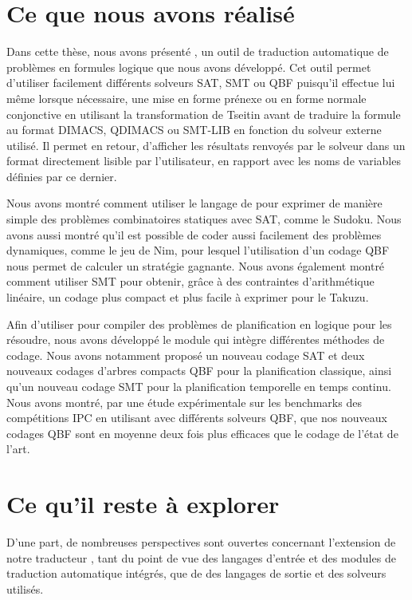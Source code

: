 \section{Ce que nous avons réalisé}

Dans cette thèse, nous avons présenté \touist, un outil de traduction automatique de problèmes en formules logique que nous avons développé. Cet outil permet d'utiliser facilement différents solveurs SAT, SMT ou QBF puisqu'il effectue lui même lorsque nécessaire, une mise en forme prénexe ou en forme normale conjonctive en utilisant la transformation de Tseitin avant de traduire la formule au format DIMACS, QDIMACS ou SMT-LIB en fonction du solveur externe utilisé. Il permet en retour, d'afficher les résultats renvoyés par le solveur dans un format directement lisible par l'utilisateur, en rapport avec les noms de variables définies par ce dernier.

Nous avons montré comment utiliser le langage de \touist pour exprimer de manière simple des problèmes combinatoires statiques avec SAT, comme le Sudoku. Nous avons aussi montré qu'il est possible de coder aussi facilement des problèmes dynamiques, comme le jeu de Nim, pour lesquel l'utilisation d'un codage QBF nous permet de calculer un stratégie gagnante. Nous avons également montré comment utiliser SMT pour obtenir, grâce à des contraintes d'arithmétique linéaire, un codage plus compact et plus facile à exprimer pour le Takuzu.

Afin d'utiliser \touist pour compiler des problèmes de planification en logique pour les résoudre, nous avons développé le module \touistplan qui intègre différentes méthodes de codage.
Nous avons notamment proposé un nouveau codage SAT et deux nouveaux codages d'arbres compacts QBF pour la planification classique, ainsi qu'un nouveau codage SMT pour la planification temporelle en temps continu. Nous avons montré, par une étude expérimentale sur les benchmarks des compétitions IPC en utilisant \touistplan avec différents solveurs QBF, que nos nouveaux codages QBF sont en moyenne deux fois plus efficaces que le codage de l'état de l'art.

\section{Ce qu'il reste à explorer}

D'une part, de nombreuses perspectives sont ouvertes concernant l'extension de notre traducteur \touist, tant du point de vue des langages d'entrée et des modules de traduction automatique intégrés, que de des langages de sortie et des solveurs utilisés.

